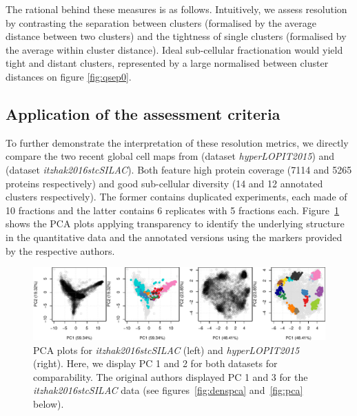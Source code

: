 \documentclass[12pt]{article}\usepackage[]{graphicx}\usepackage[]{color}
\makeatletter
\def\maxwidth{ %
  \ifdim\Gin@nat@width>\linewidth
    \linewidth
  \else
    \Gin@nat@width
  \fi
}
\newenvironment{knitrout}{}{} %
\makeatother
\begin{document}
The rational behind these measures is as follows. Intuitively, we
assess resolution by contrasting the separation between clusters
(formalised by the average distance between two clusters) and the
tightness of single clusters (formalised by the average within cluster
distance). Ideal sub-cellular fractionation would yield tight and
distant clusters, represented by a large normalised between cluster
distances on figure \ref{fig:qsep0}.

\clearpage

\subsection{Application of the assessment criteria}\label{sec:applic}



To further demonstrate the interpretation of these resolution metrics,
we directly compare the two recent global cell maps from
\cite{Christoforou:2016} (dataset \textit{hyperLOPIT2015}) and
\cite{Itzhak:2016} (dataset \textit{itzhak2016stcSILAC}). Both feature
high protein coverage (7114 and 5265 proteins
respectively) and good sub-cellular diversity (14 and
12 annotated clusters respectively). The former contains
duplicated experiments, each made of 10 fractions and the latter
contains 6 replicates with 5 fractions each. Figure~\ref{fig:pcacmp}
shows the PCA plots applying transparency to identify the underlying
structure in the quantitative data and the annotated versions using
the markers provided by the respective authors.

\begin{figure}[!h]
  \centering
\begin{knitrout}
\color{fgcolor}
\includegraphics[width=\maxwidth]{figure/pcacmp-1} 

\end{knitrout}
\caption{PCA plots for \textit{itzhak2016stcSILAC} (left) and
  \textit{hyperLOPIT2015} (right). Here, we display PC 1 and 2 for
  both datasets for comparability. The original authors displayed PC 1
  and 3 for the \textit{itzhak2016stcSILAC} data (see
  figures~\ref{fig:denspca} and~\ref{fig:pca} below).}
  \label{fig:pcacmp}
\end{figure}
\end{document}
